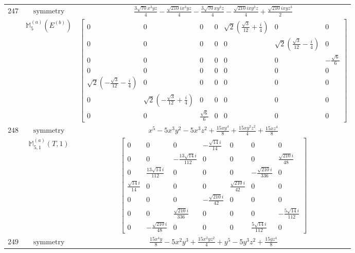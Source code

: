 \documentclass[fleqn,8pt,landscape]{jsarticle}
\begin{document}
\begin{longtable}{ccc}
$ 247 $ & $ \text{symmetry} $ & $ \frac{3 \sqrt{70} x^{3} y z}{4} - \frac{\sqrt{210} i x^{3} y z}{4} - \frac{3 \sqrt{70} x y^{3} z}{4} - \frac{\sqrt{210} i x y^{3} z}{4} + \frac{\sqrt{210} i x y z^{3}}{2} $ \\
$  $ & $ \mathbb{M}_{5}^{(a)}(E^{(b)}) $ & $ \begin{bmatrix} 0 & 0 & 0 & 0 & \sqrt{2} \left(\frac{\sqrt{3}}{12} + \frac{i}{4}\right) & 0 & 0 \\ 0 & 0 & 0 & 0 & 0 & \sqrt{2} \left(\frac{\sqrt{3}}{12} - \frac{i}{4}\right) & 0 \\ 0 & 0 & 0 & 0 & 0 & 0 & - \frac{\sqrt{6}}{6} \\ 0 & 0 & 0 & 0 & 0 & 0 & 0 \\ \sqrt{2} \left(- \frac{\sqrt{3}}{12} - \frac{i}{4}\right) & 0 & 0 & 0 & 0 & 0 & 0 \\ 0 & \sqrt{2} \left(- \frac{\sqrt{3}}{12} + \frac{i}{4}\right) & 0 & 0 & 0 & 0 & 0 \\ 0 & 0 & \frac{\sqrt{6}}{6} & 0 & 0 & 0 & 0 \end{bmatrix} $ \\ \hline
$ 248 $ & $ \text{symmetry} $ & $ x^{5} - 5 x^{3} y^{2} - 5 x^{3} z^{2} + \frac{15 x y^{4}}{8} + \frac{15 x y^{2} z^{2}}{4} + \frac{15 x z^{4}}{8} $ \\
$  $ & $ \mathbb{M}_{5,1}^{(a)}(T,1) $ & $ \begin{bmatrix} 0 & 0 & 0 & - \frac{\sqrt{14} i}{14} & 0 & 0 & 0 \\ 0 & 0 & - \frac{13 \sqrt{14} i}{112} & 0 & 0 & 0 & \frac{\sqrt{210} i}{48} \\ 0 & \frac{13 \sqrt{14} i}{112} & 0 & 0 & 0 & - \frac{\sqrt{210} i}{336} & 0 \\ \frac{\sqrt{14} i}{14} & 0 & 0 & 0 & \frac{\sqrt{210} i}{42} & 0 & 0 \\ 0 & 0 & 0 & - \frac{\sqrt{210} i}{42} & 0 & 0 & 0 \\ 0 & 0 & \frac{\sqrt{210} i}{336} & 0 & 0 & 0 & - \frac{5 \sqrt{14} i}{112} \\ 0 & - \frac{\sqrt{210} i}{48} & 0 & 0 & 0 & \frac{5 \sqrt{14} i}{112} & 0 \end{bmatrix} $ \\ \hline
$ 249 $ & $ \text{symmetry} $ & $ \frac{15 x^{4} y}{8} - 5 x^{2} y^{3} + \frac{15 x^{2} y z^{2}}{4} + y^{5} - 5 y^{3} z^{2} + \frac{15 y z^{4}}{8} $ \\

\end{longtable}
\end{document}
